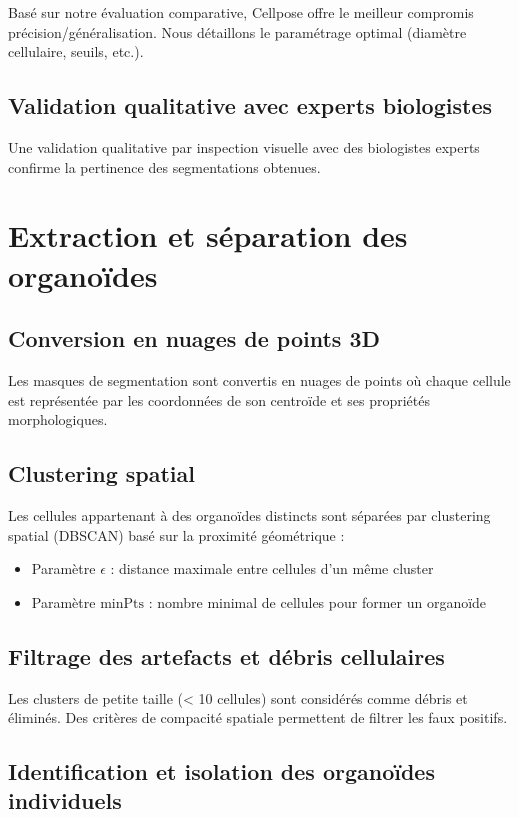 Basé sur notre évaluation comparative, Cellpose offre le meilleur compromis précision/généralisation. Nous détaillons le paramétrage optimal (diamètre cellulaire, seuils, etc.).

\subsection{Validation qualitative avec experts biologistes}

Une validation qualitative par inspection visuelle avec des biologistes experts confirme la pertinence des segmentations obtenues.

\section{Extraction et séparation des organoïdes}

\subsection{Conversion en nuages de points 3D}

Les masques de segmentation sont convertis en nuages de points où chaque cellule est représentée par les coordonnées de son centroïde et ses propriétés morphologiques.

\subsection{Clustering spatial}

Les cellules appartenant à des organoïdes distincts sont séparées par clustering spatial (DBSCAN) basé sur la proximité géométrique :
\begin{itemize}
    \item Paramètre $\epsilon$ : distance maximale entre cellules d'un même cluster
    \item Paramètre $\text{minPts}$ : nombre minimal de cellules pour former un organoïde
\end{itemize}

\subsection{Filtrage des artefacts et débris cellulaires}

Les clusters de petite taille (< 10 cellules) sont considérés comme débris et éliminés. Des critères de compacité spatiale permettent de filtrer les faux positifs.

\subsection{Identification et isolation des organoïdes individuels}

